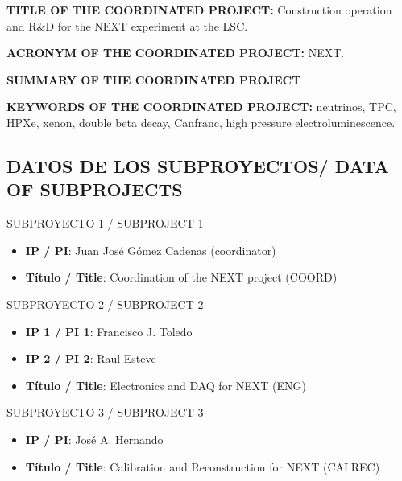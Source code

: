 \documentclass[a4paper,11pt,oneside]{article}
\begin{document}
 \vspace{0.6cm}
{\sc \bf TITLE OF THE COORDINATED PROJECT:} Construction operation and R\&D for the NEXT experiment at the LSC. 
\vspace{0.3cm}

{\sc \bf ACRONYM OF THE COORDINATED PROJECT:} NEXT.
\vspace{0.3cm}

{\bf \bf SUMMARY OF THE COORDINATED PROJECT} 
\vspace{0.3cm}



 \vspace{0.3cm}

{\bf KEYWORDS OF THE COORDINATED PROJECT:} neutrinos, TPC, HPXe, xenon, double beta decay, Canfranc, high pressure electroluminescence. 

\newpage

\subsection{DATOS DE LOS SUBPROYECTOS/ DATA OF SUBPROJECTS }

{\sc SUBPROYECTO 1 / SUBPROJECT 1}

\begin{itemize}
\item {\bf IP / PI}: Juan José Gómez Cadenas (coordinator)
\item {\bf Título / Title}: Coordination of the NEXT project (COORD)
\end{itemize}

{\sc SUBPROYECTO 2 / SUBPROJECT 2}

\begin{itemize}
\item {\bf IP 1 / PI 1}: Francisco J. Toledo 
\item {\bf IP 2 / PI 2}: Raul Esteve
\item {\bf Título / Title}: Electronics and DAQ for NEXT (ENG)
\end{itemize}

{\sc SUBPROYECTO 3 / SUBPROJECT 3}

\begin{itemize}
\item {\bf IP / PI}: José A. Hernando
\item {\bf Título / Title}: Calibration and Reconstruction for NEXT (CALREC)
\end{itemize}
\end{document}
